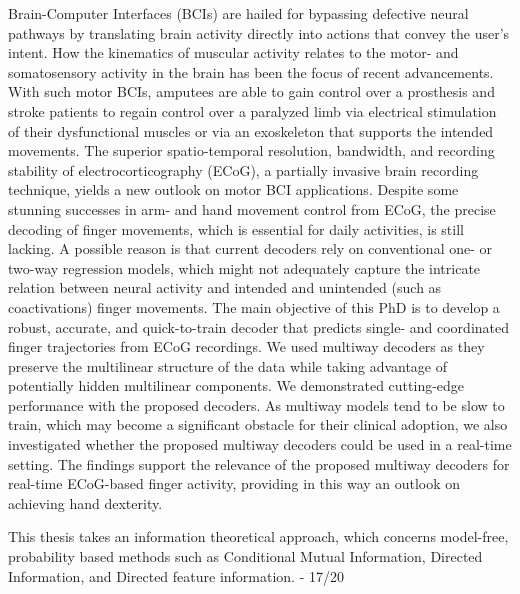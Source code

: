 
\begin{cventries}
{\begin{cvitems}\item Brain-Computer Interfaces (BCIs) are hailed for bypassing defective neural pathways by translating brain activity directly into actions that convey the user's intent. How the kinematics of muscular activity relates to the motor- and somatosensory activity in the brain has been the focus of recent advancements. With such motor BCIs, amputees are able to gain control over a prosthesis and stroke patients to regain control over a paralyzed limb via electrical stimulation of their dysfunctional muscles or via an exoskeleton that supports the intended movements. The superior spatio-temporal resolution, bandwidth, and recording stability of electrocorticography (ECoG), a partially invasive brain recording technique, yields a new outlook on motor BCI applications. Despite some stunning successes in arm- and hand movement control from ECoG, the precise decoding of finger movements, which is essential for daily activities, is still lacking. A possible reason is that current decoders rely on conventional one- or two-way regression models, which might not adequately capture the intricate relation between neural activity and intended and unintended (such as coactivations) finger movements. The main objective of this PhD is to develop a robust, accurate, and quick-to-train decoder that predicts single- and coordinated finger trajectories from ECoG recordings. We used multiway decoders as they preserve the multilinear structure of the data while taking advantage of potentially hidden multilinear components. We demonstrated cutting-edge performance with the proposed decoders. As multiway models tend to be slow to train, which may become a significant obstacle for their clinical adoption, we also investigated whether the proposed multiway decoders could be used in a real-time setting. The findings support the relevance of the proposed multiway decoders for real-time ECoG-based finger activity, providing in this way an outlook on achieving hand dexterity.
\end{cvitems}
}

{\begin{cvitems}\item This thesis takes an information theoretical approach, which concerns model-free, probability based methods such as Conditional Mutual Information, Directed Information, and Directed feature information. - 17/20
\end{cvitems}
}


\end{cventries}
